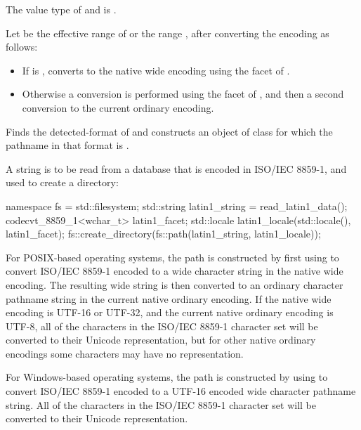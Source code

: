 \begin{itemdescr}
\pnum
\mandates
The value type of  and  is
.

\pnum
\effects
Let  be the effective range of 
or the range ,
after converting the encoding as
follows:
\begin{itemize}
\item
If  is , converts to the native
wide encoding using the 
facet of .
\item
Otherwise a conversion is performed using the
 facet of , and then a second
conversion to the current ordinary encoding.
\end{itemize}

\pnum
Finds the detected-format of 
and constructs an object of class 
for which the pathname in that format is .

\begin{example}
A string is to be read from a database
that is encoded in ISO/IEC 8859-1, and used to create a directory:
\begin{codeblock}
namespace fs = std::filesystem;
std::string latin1_string = read_latin1_data();
codecvt_8859_1<wchar_t> latin1_facet;
std::locale latin1_locale(std::locale(), latin1_facet);
fs::create_directory(fs::path(latin1_string, latin1_locale));
\end{codeblock}
For POSIX-based operating systems, the path is constructed by first using
 to convert ISO/IEC 8859-1 encoded
 to a wide character string in the native wide
encoding. The resulting wide string is then
converted to an ordinary character
pathname string in the current native ordinary encoding. If the
native wide encoding is UTF-16 or UTF-32, and the current native ordinary
encoding is UTF-8, all of the characters in the ISO/IEC 8859-1 character set
will be converted to their Unicode representation, but for other native
ordinary encodings some characters may have no representation.

For Windows-based operating systems, the path is constructed by
using  to convert ISO/IEC 8859-1 encoded
 to a UTF-16 encoded wide character pathname
string. All of the characters in the ISO/IEC 8859-1 character set will be
converted to their Unicode representation.
\end{example}
\end{itemdescr}

